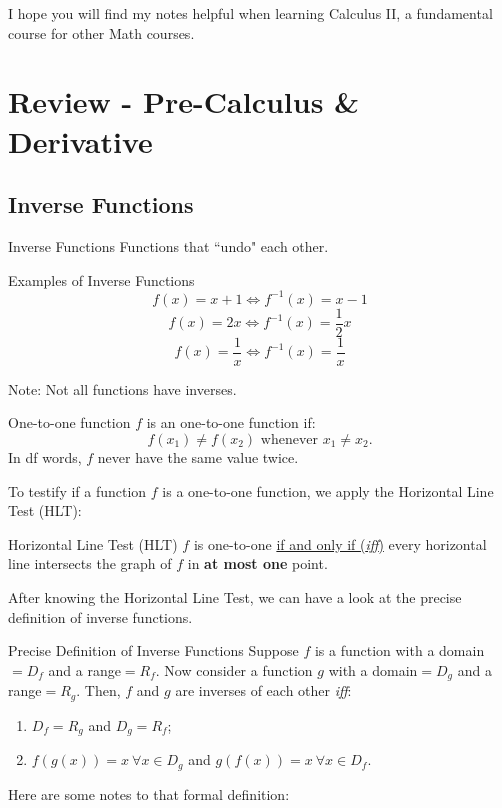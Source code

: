 \documentclass[12pt,a4paper]{article}
\begin{document}
I hope you will find my notes helpful when learning Calculus II, a fundamental course for other Math courses. 


\newpage
\section{Review - Pre-Calculus \& Derivative}
\subsection{Inverse Functions}
\begin{df}{Inverse Functions}
	Functions that ``undo" each other.
\end{df}
\begin{eg}{Examples of Inverse Functions}
	$$f(x)=x+1 \Longleftrightarrow f^{-1}(x)=x-1$$
	$$f(x)=2x \Longleftrightarrow f^{-1}(x)=\dfrac{1}{2}x$$
	$$f(x)=\dfrac{1}{x} \Longleftrightarrow f^{-1}(x)=\dfrac{1}{x}$$
\end{eg}
Note: Not all functions have inverses.
\begin{df}{One-to-one function}
	$f$ is an one-to-one function if: 
	$$f(x_1)\neq f(x_2)\text{ whenever }x_1\neq x_2.$$
	In df words, $f$ never have the same value twice. 
\end{df}
To testify if a function $f$ is a one-to-one function, we apply the Horizontal Line Test (HLT): 
\begin{thm}{Horizontal Line Test (HLT)}
	$f$ is one-to-one \underline{if and only if (\textit{iff})} every horizontal line intersects the graph of $f$ in \textbf{at most one} point.
\end{thm}
After knowing the Horizontal Line Test, we can have a look at the precise definition of inverse functions. 
\begin{df}{Precise Definition of Inverse Functions}
	Suppose $f$ is a function with a domain$=D_f$ and a range$=R_f$. Now consider a function $g$ with a domain$=D_g$ and a range$=R_g$. Then, $f$ and $g$ are inverses of each other \textit{iff}: 
	\begin{enumerate}
		\item $D_f=R_g$ and $D_g=R_f$;
		\item $f(g(x))=x\ \forall x\in D_g$ and $g(f(x))=x\ \forall x\in D_f$.
	\end{enumerate}
\end{df}
Here are some notes to that formal definition: 
\end{document}

